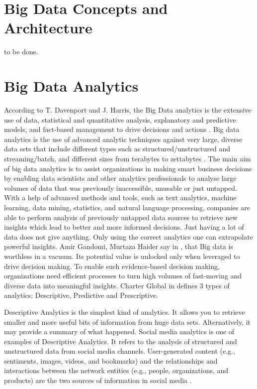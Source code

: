 \documentclass[runningheads]{llncs}
\begin{document}
\section{Big Data Concepts and Architecture}
to be done.

\section{Big Data Analytics}
According to T. Davenport and J. Harris, the Big Data analytics is the extensive use of data, statistical and quantitative analysis, explanatory and predictive models, and fact-based management to drive decisions and actions \cite{DAVBOOK}. Big data analytics is the use of advanced analytic techniques against very large, diverse data sets that include different types such as structured/unstructured and streaming/batch, and different sizes from terabytes to zettabytes \cite{IBM}. The main aim of big data analytics is to assist organizations in making smart business decisions by enabling data scientists and other analytics professionals to analyse large volumes of data that  was previously inaccessible, unusable or just untapped.  With a help of advanced methods and tools, such as text analytics, machine learning, data mining, statistics, and natural language processing, companies are able to perform analysis of previously untapped data sources to retrieve new insights which lead to better and more informed decisions. Just having a lot of data does not give anything. Only using the correct analytics one can extrapolate powerful insights. Amir Gandomi, Murtaza Haider say in \cite{ELS}, that Big data is worthless in a vacuum. Its potential value is unlocked only when leveraged to drive decision making. To enable such evidence-based decision making, organizations need efficient processes to turn high volumes of fast-moving and diverse data into meaningful insights. Charter Global in \cite{CHARTER} defines 3 types of analytics: Descriptive, Predictive and Prescriptive. 

Descriptive Analytics is the simplest kind of analytics. It allows you to retrieve smaller and more useful bits of information from huge data sets. Alternatively, it may provide a summary of what happened. Social media analytics is one of examples of Descriptive Analytics. It refers to the analysis of structured and unstructured data from social media channels. User-generated content (e.g., sentiments, images, videos, and bookmarks) and the relationships and interactions between the network entities (e.g., people, organizations, and products) are the two sources of information in social media \cite{ELS}. 
\end{document}

